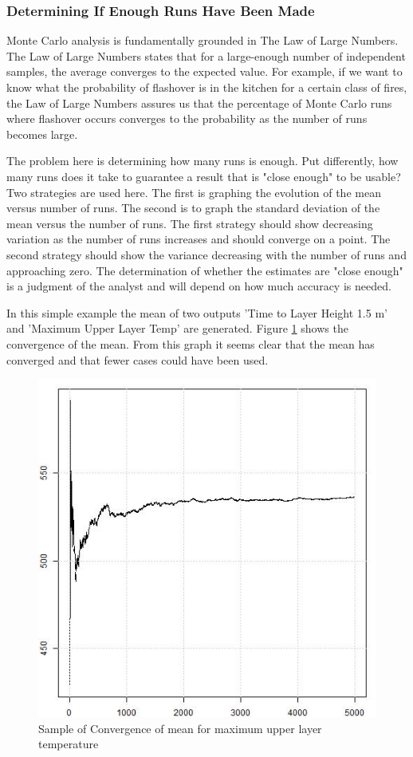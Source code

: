 \documentclass[12pt,twoside]{book}
\begin{document}
\subsubsection{Determining If Enough Runs Have Been Made}

Monte Carlo analysis is fundamentally grounded in The Law of Large Numbers. The Law of Large Numbers states that for a large-enough number of independent samples, the average converges to the expected value. For example, if we want to know what the probability of flashover is in the kitchen for a certain class of fires, the Law of Large Numbers assures us that the percentage of Monte Carlo runs where flashover occurs converges to the probability as the number of runs becomes large.

The problem here is determining how many runs is enough. Put differently, how many runs does it take to guarantee a result that is "close enough" to be usable? Two strategies are used here. The first is graphing the evolution of the mean versus number of runs. The second is to graph the standard deviation of the mean versus the number of runs. The first strategy should show decreasing variation as the number of runs increases and should converge on a point. The second strategy should show the variance decreasing with the number of runs and approaching zero. The determination of whether the estimates are "close enough" is a judgment of the analyst and will depend on how much accuracy is needed.

In this simple example the mean of two outputs {\ct 'Time to Layer Height 1.5 m'} and {\ct 'Maximum Upper Layer Temp'} are generated. Figure \ref{simple_max_temp_mean} shows the convergence of the mean. From this graph it seems clear that the mean has converged and that fewer cases could have been used.

\begin{figure}[h!]
\centering
\includegraphics[width=4.5in]{FIGURES/simple_max_temp_mean.jpeg}
\caption{Sample of Convergence of mean for maximum upper layer temperature}
\label{simple_max_temp_mean}
\end{figure}
\end{document}

